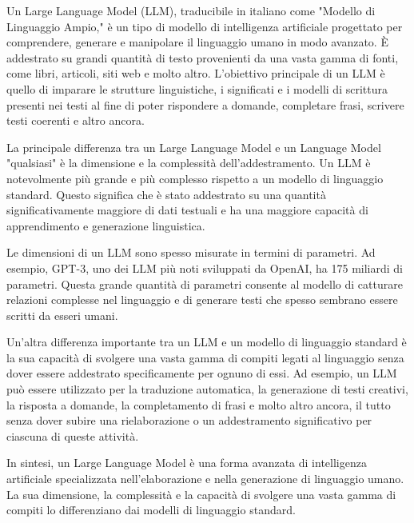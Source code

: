 Un Large Language Model (LLM), traducibile in italiano come "Modello di Linguaggio Ampio," è un tipo di modello di intelligenza artificiale progettato per comprendere, generare e manipolare il linguaggio umano in modo avanzato. È addestrato su grandi quantità di testo provenienti da una vasta gamma di fonti, come libri, articoli, siti web e molto altro. L'obiettivo principale di un LLM è quello di imparare le strutture linguistiche, i significati e i modelli di scrittura presenti nei testi al fine di poter rispondere a domande, completare frasi, scrivere testi coerenti e altro ancora.

La principale differenza tra un Large Language Model e un Language Model "qualsiasi" è la dimensione e la complessità dell'addestramento. Un LLM è notevolmente più grande e più complesso rispetto a un modello di linguaggio standard. Questo significa che è stato addestrato su una quantità significativamente maggiore di dati testuali e ha una maggiore capacità di apprendimento e generazione linguistica.

Le dimensioni di un LLM sono spesso misurate in termini di parametri. Ad esempio, GPT-3, uno dei LLM più noti sviluppati da OpenAI, ha 175 miliardi di parametri. Questa grande quantità di parametri consente al modello di catturare relazioni complesse nel linguaggio e di generare testi che spesso sembrano essere scritti da esseri umani.

Un'altra differenza importante tra un LLM e un modello di linguaggio standard è la sua capacità di svolgere una vasta gamma di compiti legati al linguaggio senza dover essere addestrato specificamente per ognuno di essi. Ad esempio, un LLM può essere utilizzato per la traduzione automatica, la generazione di testi creativi, la risposta a domande, la completamento di frasi e molto altro ancora, il tutto senza dover subire una rielaborazione o un addestramento significativo per ciascuna di queste attività.

In sintesi, un Large Language Model è una forma avanzata di intelligenza artificiale specializzata nell'elaborazione e nella generazione di linguaggio umano. La sua dimensione, la complessità e la capacità di svolgere una vasta gamma di compiti lo differenziano dai modelli di linguaggio standard.